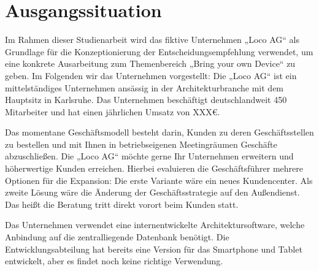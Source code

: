 \chapter{Ausgangssituation}
Im Rahmen dieser Studienarbeit wird das fiktive Unternehmen „Loco AG“ als Grundlage für die Konzeptionierung der Entscheidungsempfehlung verwendet, um eine konkrete Ausarbeitung zum Themenbereich „Bring your own Device“ zu geben. Im Folgenden wir das Unternehmen vorgestellt:
Die „Loco AG“ ist ein mittelständiges Unternehmen ansässig in der Architekturbranche mit dem Hauptsitz in Karlsruhe. Das Unternehmen beschäftigt deutschlandweit 450 Mitarbeiter und hat einen jährlichen Umsatz von XXX€.\,

Das momentane Geschäftsmodell besteht darin, Kunden zu deren Geschäftsstellen zu bestellen und mit Ihnen in betriebseigenen Meetingräumen Geschäfte abzuschließen. Die „Loco AG“ möchte gerne Ihr Unternehmen erweitern und höherwertige Kunden erreichen. Hierbei evaluieren die Geschäftsführer mehrere Optionen für die Expansion: Die erste Variante wäre ein neues  Kundencenter. Als zweite Lösung wäre die Änderung der Geschäftsstrategie auf den Außendienst. Das heißt die Beratung tritt direkt vorort beim Kunden statt. 

Das Unternehmen verwendet eine internentwickelte Architektursoftware, welche Anbindung auf die zentralliegende Datenbank benötigt. Die Entwicklungsabteilung hat bereits eine Version für das Smartphone und Tablet entwickelt, aber es findet noch keine richtige Verwendung.

 